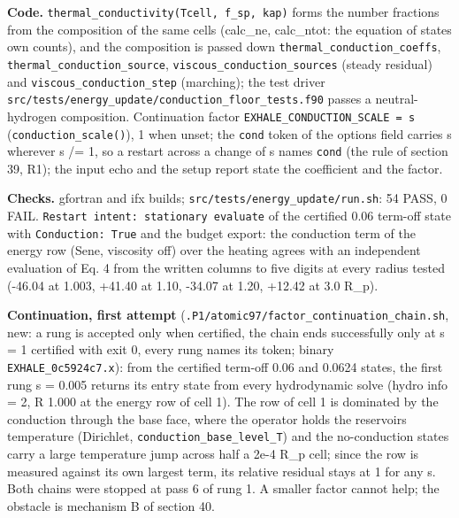 \documentclass[english,a4paper]{my_memo}
\begin{document}
\textbf{Code.} \texttt{thermal\_conductivity(Tcell,\ f\_sp,\ kap)} forms the number fractions
from the composition of the same cells (calc\_ne, calc\_ntot: the equation of
state\textquotesingle s own counts), and the composition is passed down
\texttt{thermal\_conduction\_coeffs}, \texttt{thermal\_conduction\_source},
\texttt{viscous\_conduction\_sources} (steady residual) and \texttt{viscous\_conduction\_step}
(marching); the test driver \texttt{src/tests/energy\_update/conduction\_floor\_tests.f90}
passes a neutral-hydrogen composition. Continuation factor
\texttt{EXHALE\_CONDUCTION\_SCALE\ =\ s} (\texttt{conduction\_scale()}), 1 when unset; the
\texttt{cond} token of the options field carries s wherever s /= 1, so a restart
across a change of s names \texttt{cond} (the rule of section 39, R1); the input
echo and the setup report state the coefficient and the factor.

\textbf{Checks.} gfortran and ifx builds; \texttt{src/tests/energy\_update/run.sh}: 54 PASS,
0 FAIL. \texttt{Restart\ intent:\ stationary\ evaluate} of the certified 0.06 term-off
state with \texttt{Conduction:\ True} and the budget export: the conduction term of
the energy row (Sene, viscosity off) over the heating agrees with an
independent evaluation of Eq. 4\textquotesingle{} from the written columns to five digits at
every radius tested (-46.04 at 1.003, +41.40 at 1.10, -34.07 at 1.20, +12.42
at 3.0 R\_p).

\textbf{Continuation, first attempt} (\texttt{.P1/atomic97/factor\_continuation\_chain.sh},
new: a rung is accepted only when certified, the chain ends successfully only
at s = 1 certified with exit 0, every rung names its token; binary
\texttt{EXHALE\_0c5924c7.x}): from the certified term-off 0.06 and 0.0624 states, the
first rung s = 0.005 returns its entry state from every hydrodynamic solve
(hydro info = 2, \textbar\textbar R\textbar\textbar{} 1.000 at the energy row of cell 1). The row of cell 1
is dominated by the conduction through the base face, where the operator
holds the reservoir\textquotesingle s temperature (Dirichlet, \texttt{conduction\_base\_level\_T}) and
the no-conduction states carry a large temperature jump across half a
2e-4 R\_p cell; since the row is measured against its own largest term, its
relative residual stays at 1 for any s. Both chains were stopped at pass 6
of rung 1. A smaller factor cannot help; the obstacle is mechanism B of
section 40.
\end{document}
